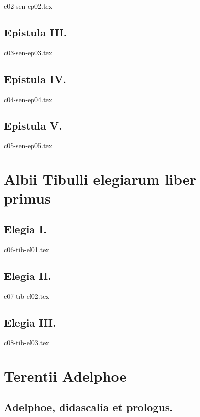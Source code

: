 \documentclass[a4paper,12pt,twoside]{report}
\begin{document}
{c02-sen-ep02.tex}

\chapter{Epistula III.}

{c03-sen-ep03.tex}

\chapter{Epistula IV.}

{c04-sen-ep04.tex}

\chapter{Epistula V.}

{c05-sen-ep05.tex}

\part{Albii Tibulli elegiarum liber primus}

\chapter{Elegia I.}


{c06-tib-el01.tex}

\chapter{Elegia II.}


{c07-tib-el02.tex}

\chapter{Elegia III.}


{c08-tib-el03.tex}




\part{Terentii Adelphoe}

\chapter{Adelphoe, didascalia et prologus.}
\end{document}
